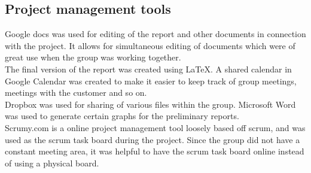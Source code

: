 \subsection{Project management tools}
Google docs was used for editing of the report and other documents in connection with the project. It allows for simultaneous editing of documents which were of great use when the group was working together.\\
The final version of the report was created using \LaTeX.
A shared calendar in Google Calendar was created to make it easier to keep track of group meetings, meetings with the customer and so on.\\
Dropbox was used for sharing of various files within the group. 
Microsoft Word was used to generate certain graphs for the preliminary reports.\\
\newline
Scrumy.com is a online project management tool loosely based off scrum, and was used as the scrum task board during the project. Since the group did not have a constant meeting area, it was helpful to have the scrum task board online instead of using a physical board.